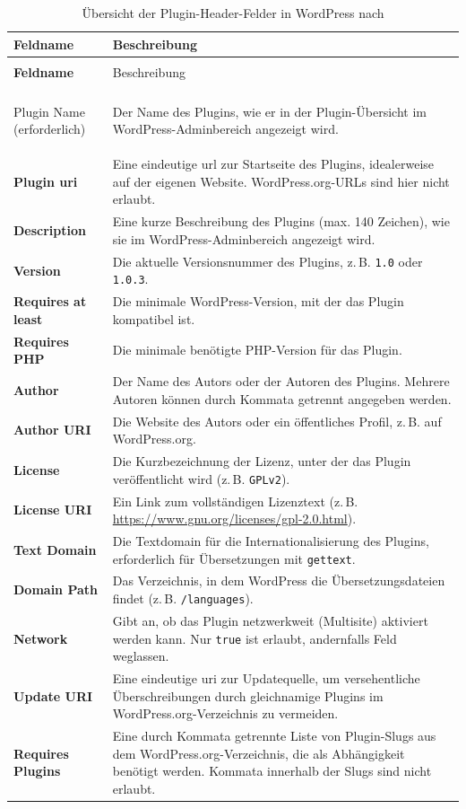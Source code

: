 \begin{longtable}{>{\bfseries}p{4cm} p{10cm}}
 \caption{Übersicht der Plugin-Header-Felder in WordPress nach \cite{wordpress2024HeaderRequirement}} \\
 \hline
 Feldname & Beschreibung \\
 \hline
 \endfirsthead

 \multicolumn{2}{l}{\textit{Fortsetzung von vorheriger Seite}} \\
 \hline
 Feldname & Beschreibung \\
 \hline
 \endhead

 \hline
 \multicolumn{2}{r}{\textit{Fortsetzung auf nächster Seite}} \\
 \endfoot

 \hline
 \endlastfoot

 Plugin Name (erforderlich) & Der Name des Plugins, wie er in der Plugin-Übersicht im WordPress-Adminbereich angezeigt wird. \\
 Plugin \gls{uri} & Eine eindeutige \gls{url} zur Startseite des Plugins, idealerweise auf der eigenen Website. WordPress.org-URLs sind hier nicht erlaubt. \\
 Description & Eine kurze Beschreibung des Plugins (max. 140 Zeichen), wie sie im WordPress-Adminbereich angezeigt wird. \\
 Version & Die aktuelle Versionsnummer des Plugins, z.\,B. \texttt{1.0} oder \texttt{1.0.3}. \\
 Requires at least & Die minimale WordPress-Version, mit der das Plugin kompatibel ist. \\
 Requires PHP & Die minimale benötigte PHP-Version für das Plugin. \\
 Author & Der Name des Autors oder der Autoren des Plugins. Mehrere Autoren können durch Kommata getrennt angegeben werden. \\
 Author URI & Die Website des Autors oder ein öffentliches Profil, z.\,B. auf WordPress.org. \\
 License & Die Kurzbezeichnung der Lizenz, unter der das Plugin veröffentlicht wird (z.\,B. \texttt{GPLv2}). \\
 License URI & Ein Link zum vollständigen Lizenztext (z.\,B. \url{https://www.gnu.org/licenses/gpl-2.0.html}). \\
 Text Domain & Die Textdomain für die Internationalisierung des Plugins, erforderlich für Übersetzungen mit \texttt{gettext}. \\
 Domain Path & Das Verzeichnis, in dem WordPress die Übersetzungsdateien findet (z.\,B. \texttt{/languages}). \\
 Network & Gibt an, ob das Plugin netzwerkweit (Multisite) aktiviert werden kann. Nur \texttt{true} ist erlaubt, andernfalls Feld weglassen. \\
 Update URI & Eine eindeutige \gls{uri} zur Updatequelle, um versehentliche Überschreibungen durch gleichnamige Plugins im WordPress.org-Verzeichnis zu vermeiden. \\
 Requires Plugins & Eine durch Kommata getrennte Liste von Plugin-Slugs aus dem WordPress.org-Verzeichnis, die als Abhängigkeit benötigt werden. Kommata innerhalb der Slugs sind nicht erlaubt. \\
\end{longtable}

